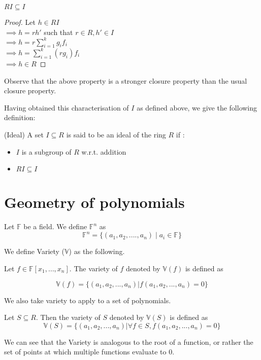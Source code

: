 \begin{observation}
$RI \subseteq I$ 
\end{observation}
\begin{proof}
Let $h \in RI$\\
$\implies h=rh'$ such that $r \in R, h' \in I$\\
$\implies h=r\sum\limits_{i=1}^{k} g_{i}f_{i}$\\
$\implies h=\sum\limits_{i=1}^{k} (rg_{i})f_{i}$\\
$\implies h \in R$
\end{proof}

Observe that the above property is a stronger closure property than the usual closure property.


Having obtained this characterisation of $I$ as defined above, we give the following definition:
\begin{definition} (Ideal)
A set $I\subseteq R$ is said to be an ideal of the ring $R$ if :
\begin{itemize}
\item $I$ is a subgroup of $R$ w.r.t. addition
\item $RI \subseteq I$
\end{itemize}
\end{definition}

\section{Geometry of polynomials}
Let $\mathbb{F}$ be a field. We define $\mathbb{F}^n$ as 
\[
\mathbb{F}^n = \{(a_1,a_2,....,a_n) \mid a_i \in \mathbb{F}\}
\]

We define Variety ($\mathbb{V}$) as the following.

Let $f\in\mathbb{F}[x_1,\dots,x_n]$. The variety of $f$ denoted by $\mathbb{V}(f)$ is defined as

\begin{equation}
\mathbb{V}(f) = \{(a_1,a_2,...,a_n) | f(a_1,a_2,...,a_n)=0\}
\end{equation}

We also take variety to apply to a set of polynomials. 

Let $S \subseteq R$. Then the variety of $S$ denoted by $\mathbb{V}(S)$ is defined as 
\begin{equation}
\mathbb{V}(S) = \{(a_1,a_2,...,a_n) | \forall f \in S, f(a_1,a_2,...,a_n)=0\}
\end{equation}

We can see that the Variety is analogous to the root of a function, or rather the set of points at which multiple functions evaluate to 0.\\

